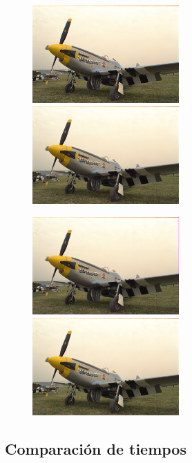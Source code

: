 \begin{figure}
       \includegraphics[width=0.5\textwidth]{imagenes/img9_demosicing_vecino.png}
           \hfill
        \includegraphics[width=0.5\textwidth]{imagenes/img9_demosicing_bilineal.png}
\end{figure}

\begin{figure}

       \includegraphics[width=0.5\textwidth]{imagenes/img9_demosicing_spline.png}
           \hfill
        \includegraphics[width=0.5\textwidth]{imagenes/img9_demosicing_quality.png}
\end{figure}

\newpage

\subsection{Comparación de tiempos}

